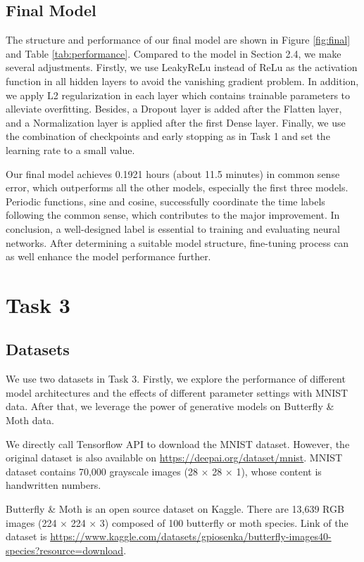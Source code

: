 \documentclass{article}
\begin{document}
\subsection{Final Model}
The structure and performance of our final model are shown in Figure \ref{fig:final} and Table \ref{tab:performance}. Compared to the model in Section 2.4, we make several adjustments. Firstly, we use LeakyReLu instead of ReLu as the activation function in all hidden layers to avoid the vanishing gradient problem. In addition, we apply L2 regularization in each layer which contains trainable parameters to alleviate overfitting. Besides, a Dropout layer is added after the Flatten layer, and a Normalization layer is applied after the first Dense layer. Finally, we use the combination of checkpoints and early stopping as in Task 1 and set the learning rate to a small value.

Our final model achieves 0.1921 hours (about 11.5 minutes) in common sense error, which outperforms all the other models, especially the first three models. Periodic functions, sine and cosine, successfully coordinate the time labels following the common sense, which contributes to the major improvement. In conclusion, a well-designed label is essential to training and evaluating neural networks. After determining a suitable model structure, fine-tuning process can as well enhance the model performance further.

\section*{Task 3}
\setcounter{section}{3}
\setcounter{subsection}{0}
\subsection{Datasets}
We use two datasets in Task 3. Firstly, we explore the performance of different model architectures and the effects of different parameter settings with MNIST data. After that, we leverage the power of generative models on Butterfly \& Moth data. \par
We directly call Tensorflow API to download the MNIST dataset. However, the original dataset is also available on \url{https://deepai.org/dataset/mnist}. MNIST dataset contains 70,000 grayscale images (28 $\times$ 28 $\times$ 1), whose content is handwritten numbers. \par
Butterfly \& Moth is an open source dataset on Kaggle. There are 13,639 RGB images (224 $\times$ 224 $\times$ 3) composed of 100 butterfly or moth species. Link of the dataset is \url{https://www.kaggle.com/datasets/gpiosenka/butterfly-images40-species?resource=download}.
\end{document}
